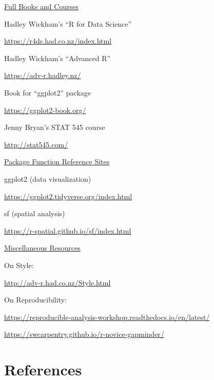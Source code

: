 \documentclass[
  letterpaper,
  DIV=11,
  numbers=noendperiod]{scrreprt}
\newlength{\cslhangindent}
\newenvironment{CSLReferences}[2] %
 {\begin{list}{}{%
  \setlength{\itemindent}{0pt}
  \setlength{\leftmargin}{0pt}
  \setlength{\parsep}{0pt}
  \ifodd #1
   \setlength{\leftmargin}{\cslhangindent}
   \setlength{\itemindent}{-1\cslhangindent}
  \fi
  \setlength{\itemsep}{#2\baselineskip}}}
 {\end{list}}
\begin{document}
\ul{Full Books and Courses}

Hadley Wickham's ``R for Data Science''

\url{https://r4ds.had.co.nz/index.html}

Hadley Wickham's ``Advanced R''

\url{https://adv-r.hadley.nz/}

Book for ``ggplot2'' package

\url{https://ggplot2-book.org/}

Jenny Bryan's STAT 545 course

\url{http://stat545.com/}

\ul{Package Function Reference Sites}

ggplot2 (data visualization)

\url{https://ggplot2.tidyverse.org/index.html}

sf (spatial analysis)

\url{https://r-spatial.github.io/sf/index.html}

\ul{Miscellaneous Resources}

On Style:

\url{http://adv-r.had.co.nz/Style.html}

On Reproducibility:

\url{https://reproducible-analysis-workshop.readthedocs.io/en/latest/}

\url{https://swcarpentry.github.io/r-novice-gapminder/}


\chapter*{References}\label{references}


\label{refs}
\begin{CSLReferences}{0}{1}
\end{CSLReferences}
\end{document}
